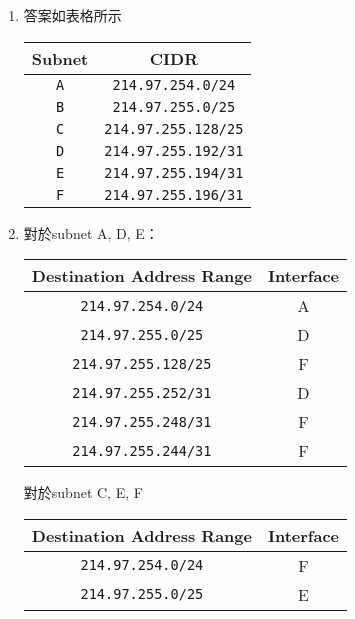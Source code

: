 \documentclass[12pt,a4paper]{article}
\begin{document}
\begin{enumerate}
\begin{enumerate}
        \item 答案如表格所示
        \begin{table}[H]
        \centering
        \begin{tabular}{|c|c|}
            \hline
                \textbf{Subnet} & \textbf{CIDR} \\ \hline
                \texttt{A} & \texttt{214.97.254.0/24} \\ \hline 
                \texttt{B} & \texttt{214.97.255.0/25} \\ \hline
                \texttt{C} & \texttt{214.97.255.128/25} \\ \hline
                \texttt{D} & \texttt{214.97.255.192/31} \\ \hline
                \texttt{E} & \texttt{214.97.255.194/31} \\ \hline
                \texttt{F} & \texttt{214.97.255.196/31} \\ \hline
        \end{tabular}
        \end{table}
        \item 對於subnet A, D, E：
        \begin{table}[H]
        \centering
        \begin{tabular}{|c|c|}
        \hline
        \textbf{Destination Address Range} & \textbf{Interface} \\ \hline
        \texttt{214.97.254.0/24}     & A \\ \hline
        \texttt{214.97.255.0/25}     & D \\ \hline
        \texttt{214.97.255.128/25}   & F \\ \hline
        \texttt{214.97.255.252/31}   & D \\ \hline
        \texttt{214.97.255.248/31}   & F \\ \hline
        \texttt{214.97.255.244/31}   & F \\ \hline
        \end{tabular}
        \end{table}
        對於subnet C, E, F
        \begin{table}[H]
        \centering
        \begin{tabular}{|c|c|}
        \hline
        \textbf{Destination Address Range} & \textbf{Interface} \\ \hline
        \texttt{214.97.254.0/24}     & F \\ \hline
        \texttt{214.97.255.0/25}     & E \\ \hline

\end{tabular}
\end{table}
\end{enumerate}
\end{enumerate}
\end{document}
